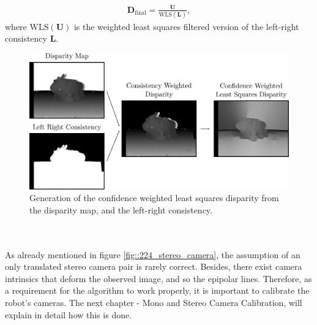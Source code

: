 \begin{align}
	\bm{D}_\text{final} = \frac{\bm{U}}{\text{WLS}(\bm{L})},
	\label{eq::224_wls_final}
\end{align}
where $\text{WLS}(\bm{U})$ is the weighted least squares filtered version of the left-right consistency $\bm{L}$.
\begin{figure}[h!]
	\centering
	\includegraphics[scale=.28]{chapters/03_principles_of_machine_learning/img/weighted_least_squares_disparity.png}
	\caption{Generation of the confidence weighted least squares disparity from the disparity map, and the left-right consistency.}
	\label{fig::224_weighted_least_squares_disparity}
\end{figure}
\\\\
As already mentioned in figure \ref{fig::224_stereo_camera}, the assumption of an only translated stereo camera pair is rarely correct. Besides, there exist camera intrinsics that deform the observed image, and so the epipolar lines. Therefore, as a requirement for the algorithm to work properly, it is important to calibrate the robot's cameras. The next chapter - Mono and Stereo Camera Calibration, will explain in detail how this is done.
\FloatBarrier
